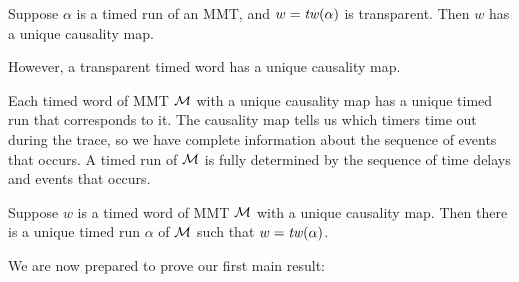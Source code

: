 \begin{lemma}
\label{lemma unique causality map}
Suppose $\alpha$ is a timed run of an MMT, and $w =  \mathit{tw}(\alpha)$ is transparent. 
Then $w$ has a unique causality map.
\end{lemma}
\else
However, a transparent timed word has a unique causality map.
\fi

Each timed word of MMT ${\mathcal M}$ with a unique causality map has a unique timed run that corresponds to it.
The causality map tells us which timers time out during the trace, so we have complete information
about the sequence of events that occurs. 
\iflong
A timed run of ${\mathcal M}$ is fully determined
by the sequence of time delays and events that occurs.

\begin{lemma}
\label{lemma unique timed run}
Suppose $w$ is a timed word of MMT ${\mathcal M}$ with a unique causality map.
Then there is a unique timed run $\alpha$ of ${\mathcal M}$ such that $w = \mathit{tw}(\alpha)$.
\end{lemma}

\fi
We are now prepared to prove our first main result:


